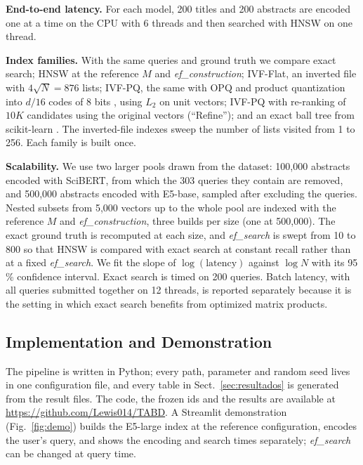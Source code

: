 \documentclass[runningheads]{llncs}
\newcommand{\efc}{\textit{ef\_construction}}
\newcommand{\efs}{\textit{ef\_search}}
\begin{document}
\textbf{End-to-end latency.} For each model, 200 titles and 200 abstracts are encoded one at
a time on the CPU with 6 threads and then searched with HNSW on one thread.

\textbf{Index families.} With the same queries and ground truth we compare exact search;
HNSW at the reference $M$ and \efc{}; IVF-Flat, an inverted file with $4\sqrt{N}=876$ lists;
IVF-PQ, the same with OPQ and product quantization into $d/16$ codes of 8 bits
\cite{ref15,ge2014}, using $L_2$ on unit vectors; IVF-PQ with re-ranking of $10K$ candidates
using the original vectors (``Refine''); and an exact ball tree from scikit-learn
\cite{omohundro1989}. The inverted-file indexes sweep the number of lists visited from 1 to
256. Each family is built once.

\textbf{Scalability.} We use two larger pools drawn from the dataset: 100,000 abstracts
encoded with SciBERT, from which the 303 queries they contain are removed, and 500,000
abstracts encoded with E5-base, sampled after excluding the queries. Nested subsets from 5,000 vectors up to the whole pool are
indexed with the reference $M$ and \efc{}, three builds per size (one at 500,000). The exact
ground truth is recomputed at each size, and \efs{} is swept from 10 to 800 so that HNSW is
compared with exact search at constant recall rather than at a fixed \efs{}. We fit the slope
of $\log(\text{latency})$ against $\log N$ with its 95\,\% confidence interval. Exact search is
timed on 200 queries. Batch latency, with all queries submitted together on 12 threads, is
reported separately because it is the setting in which exact search benefits from optimized
matrix products.

\subsection{Implementation and Demonstration}

The pipeline is written in Python; every path, parameter and random seed lives in one
configuration file, and every table in Sect.~\ref{sec:resultados} is generated from the
result files. The code, the frozen ids and the results are available at
\url{https://github.com/Lewis014/TABD}. A Streamlit demonstration (Fig.~\ref{fig:demo}) builds
the E5-large index at the reference configuration, encodes the user's query, and shows the
encoding and search times separately; \efs{} can be changed at query time.
\end{document}
